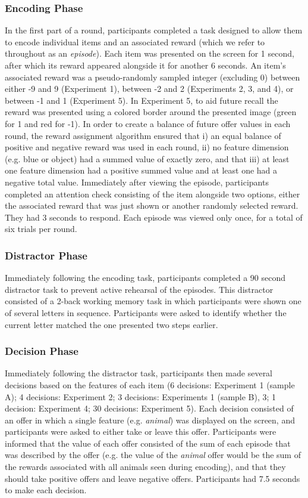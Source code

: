 \documentclass[10pt,letterpaper]{article}
\begin{document}
\subsubsection{Encoding Phase}

In the first part of a round, participants completed a task designed to allow them to encode individual items and an associated reward (which we refer to throughout as an \textit{episode}). Each item was presented on the screen for 1 second, after which its reward appeared alongside it for another 6 seconds. An item's associated reward was a pseudo-randomly sampled integer (excluding 0) between either -9 and 9 (Experiment 1), between -2 and 2 (Experiments 2, 3, and 4), or between -1 and 1 (Experiment 5). In Experiment 5, to aid future recall the reward was presented using a colored border around the presented image (green for 1 and red for -1). In order to create a balance of future offer values in each round, the reward assignment algorithm ensured that i) an equal balance of positive and negative reward was used in each round, ii) no feature dimension (e.g. blue or object) had a summed value of exactly zero, and that iii) at least one feature dimension had a positive summed value and at least one had a negative total value. Immediately after viewing the episode, participants completed an attention check consisting of the item alongside two options, either the associated reward that was just shown or another randomly selected reward. They had 3 seconds to respond. Each episode was viewed only once, for a total of six trials per round.

\subsubsection{Distractor Phase}

Immediately following the encoding task, participants completed a 90 second distractor task to prevent active rehearsal of the episodes. This distractor consisted of a 2-back working memory task in which participants were shown one of several letters in sequence. Participants were asked to identify whether the current letter matched the one presented two steps earlier.

\subsubsection{Decision Phase}

Immediately following the distractor task, participants then made several decisions based on the features of each item (6 decisions: Experiment 1 (sample A); 4 decisions: Experiment 2; 3 decisions: Experiments 1 (sample B), 3; 1 decision: Experiment 4; 30 decisions: Experiment 5). Each decision consisted of an offer in which a single feature (e.g. \textit{animal}) was displayed on the screen, and participants were asked to either take or leave this offer. Participants were informed that the value of each offer consisted of the sum of each episode that was described by the offer (e.g. the value of the \textit{animal} offer would be the sum of the rewards associated with all animals seen during encoding), and that they should take positive offers and leave negative offers. Participants had 7.5 seconds to make each decision.
\end{document}
